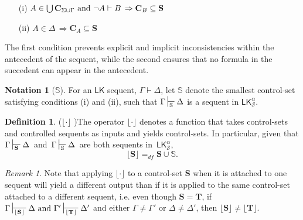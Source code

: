 \documentclass{article}                     %
\theoremstyle{theorem}
\theoremstyle{corollary}
\theoremstyle{lemma}
\theoremstyle{definition}
\newtheorem{definition}[section]{Definition}
\theoremstyle{remark}
\newtheorem{remark}{Remark}
\theoremstyle{definition}
\theoremstyle{notation}
\newtheorem{notation}{Notation}
\theoremstyle{definition}
\theoremstyle{proposition}
\theoremstyle{definition}
\begin{document}
\begin{enumerate}
                    
                
\item[(i)] $  A \in \bigcup\mathbf{C}_{\Sigma\cup\Gamma} \text{\,\,and\,\,} \neg A \vdash B\,\Rightarrow \mathbf{C}_B \subseteq \mathbf{S} $ \\
 
\item[(ii)] $A \in \Delta\,\Rightarrow \mathbf{C}_A \subseteq \mathbf{S} $\\

\end{enumerate}
\vspace{-3mm}

The first condition prevents explicit and implicit inconsistencies within the antecedent of the sequent, while the second ensures that no formula in  the succedent can appear in the antecedent. 


\begin{notation}[$\mathbb{S} $]
For an $ \mathsf{LK} $ sequent, $ \Gamma \vdash \Delta $, let $\mathbb{S}$ denote the smallest control-set satisfying conditions (i) and (ii), such that $ \Gamma\sststile{\mathbb{S}}{} \Delta $ is a sequent in $ \mathsf{LK}^\alpha_\mathcal{S} $.
\end{notation}

\begin{definition}($ \lfloor \cdot \rfloor $ )\label{Sc_Op}
The operator $ \lfloor \cdot \rfloor $ denotes a function that takes control-sets and controlled sequents as inputs and yields control-sets. In particular, given that $ \Gamma\sststile{\mathbf{S}}{} \Delta $ \,and\, $ \Gamma\sststile{\mathbb{S}}{} \Delta $\, are both sequents in \,$\mathsf{LK}^\alpha_\mathcal{S},\,$
$$ \lfloor\mathbf{S}\rfloor  =_{df} \mathbf{S} \cup \mathbb{S}. $$

\begin{remark}\label{SCSreltoseq}
Note that applying $ \lfloor \cdot \rfloor $ to a control-set $ \mathbf{S} $ when it is attached to one sequent will yield a different output than if it is applied to the same control-set  attached to a different sequent, i.e. even though $\mathbf{S} = \mathbf{T}$, if $\Gamma\sststile{\lfloor\mathbf{S}\rfloor}{} \Delta \,\,\text{and}\,\, \Gamma'\sststile{\lfloor\mathbf{T}\rfloor}{} \Delta'$ and either $\Gamma\neq \Gamma' $ or $\Delta\neq\Delta'$, then $\lfloor\mathbf{S}\rfloor \neq \lfloor\mathbf{T}\rfloor$.
\end{remark}

\end{definition}
\end{document}
